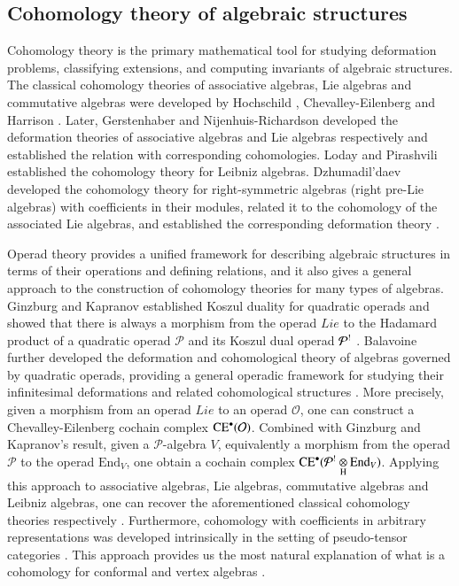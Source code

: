 \documentclass[12pt]{amsart}
\theoremstyle{definition}
\newcommand{\huaP}{\mathcal{P}}
\newcommand{\huaO}{{\mathcal{O}}}
\newcommand{\End}{\mathrm{End}}
\newcommand{\ot}{\otimes}
\newcommand{\ce}{{\rm CE}}
\begin{document}
\vspace{-3mm}

\subsection{Cohomology theory of algebraic structures}

Cohomology theory is the primary mathematical tool for studying deformation problems, classifying extensions, and computing invariants of algebraic structures.
The classical cohomology theories of associative algebras, Lie algebras and commutative algebras were developed by Hochschild \cite{Hor}, Chevalley-Eilenberg \cite{CE1948} and  Harrison \cite{Har}. Later, Gerstenhaber \cite{Ger1964} and Nijenhuis-Richardson \cite{NR} developed the deformation theories of associative algebras and Lie algebras respectively and established the relation with corresponding cohomologies.
Loday and  Pirashvili \cite{Loday} established the cohomology theory for Leibniz algebras. Dzhumadil'daev developed the cohomology theory for right-symmetric algebras (right pre-Lie algebras) with coefficients in their modules, related it to the cohomology of the associated Lie algebras, and established the corresponding deformation theory \cite{D1999}.

Operad theory provides a unified framework for describing algebraic structures in terms of their operations and defining relations, and it also gives a general approach to the construction of cohomology theories for many types of algebras.
Ginzburg and Kapranov established Koszul duality for quadratic operads and showed that there is always a morphism from the operad $Lie$ to the Hadamard product of a quadratic operad $\mathcal{P}$ and  its Koszul dual operad $\mathcal{P}^{\textup{!}}$ \cite{GK}. Balavoine further developed the deformation and cohomological theory of algebras governed by quadratic operads, providing a general operadic framework for studying their infinitesimal deformations and related cohomological structures \cite{Bala1995,Bala1998}. More precisely, given a morphism from an operad $Lie$ to an operad $\huaO$, one can construct a Chevalley-Eilenberg cochain complex $\ce^\bullet(\mathcal{O})$. Combined with Ginzburg and Kapranov's result, given a $\huaP$-algebra $V$, equivalently a morphism from the operad $\huaP$ to the operad $\End_V$, one obtain a cochain complex $\ce^\bullet(\mathcal{P}^{\textup{!}}\underset{\rm H}{\ot}\End_V)$. Applying this approach to associative algebras, Lie algebras, commutative algebras and Leibniz algebras, one can recover the aforementioned  classical cohomology theories respectively \cite[Section 3]{Bala1995}.
Furthermore, cohomology with coefficients in arbitrary representations was developed intrinsically in the setting of pseudo-tensor categories  \cite{BDK,BKV,BD}.
This approach provides us the most natural explanation of what is a cohomology for conformal and vertex algebras \cite{BKV,DBKH}.
\end{document}
